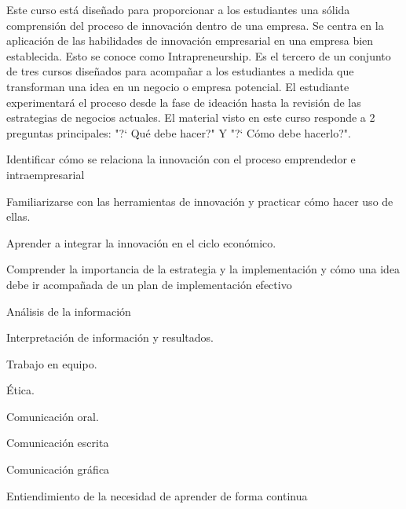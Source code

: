 \begin{syllabus}


\begin{justification}
Este curso está diseñado para proporcionar a los estudiantes una sólida comprensión del proceso de innovación dentro de una empresa. Se centra en la aplicación de las habilidades de innovación empresarial en una empresa bien establecida. Esto se conoce como Intrapreneurship.
Es el tercero de un conjunto de tres cursos diseñados para acompañar a los estudiantes a medida que transforman una idea en un negocio o empresa potencial. El estudiante experimentará el proceso desde la fase de ideación hasta la revisión de las estrategias de negocios actuales.
El material visto en este curso responde a 2 preguntas principales: "?` Qué debe hacer?" Y "?` Cómo debe hacerlo?". 

\end{justification}

\begin{goals}
\item Identificar cómo se relaciona la innovación con el proceso emprendedor e intraempresarial
\item Familiarizarse con las herramientas de innovación y practicar cómo hacer uso de ellas.
\item Aprender a integrar la innovación en el ciclo económico.
\item Comprender la importancia de la estrategia y la implementación y cómo una idea debe ir acompañada de un plan de implementación efectivo
\item Análisis de la información
\item Interpretación de información y resultados.
\item Trabajo en equipo.
\item Ética.
\item Comunicación oral.
\item Comunicación escrita
\item Comunicación gráfica
\item Entiendimiento de la necesidad de aprender de forma continua
\end{goals}

\begin{outcomes}
    \item {} %
    \item {} %
    \item {} %
    \item {} %
    \item {} %
\end{outcomes}


\end{syllabus}
